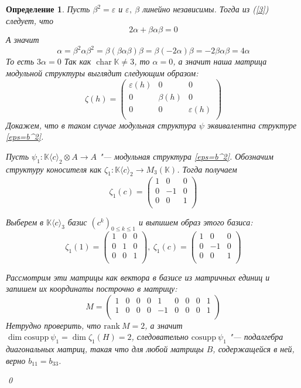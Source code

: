 \documentclass[12pt, reqno, a4paper, oneside, notitlepage]{amsart}
\makeatletter
\theoremstyle{mytheoremstyle}
\theoremstyle{myremarkstyle}
\newtheorem{definition}[theorem]{Определение}
\numberwithin{equation}{section}
\renewenvironment{proof}[1][\proofname]{\par\indent {\bfseries #1\@addpunct{.} }}{\qed}
\DeclareMathOperator{\chr}{char}
\makeatother
\begin{document}
\begin{definition}
\begin{proof}
	Пусть $\beta^2 = \varepsilon$ и $\varepsilon,\ \beta$ линейно независимы.
	Тогда из (\ref{3}) следует, что
	\[
	  2\alpha +\beta\alpha\beta = 0
	\]
	А значит \[
	  \alpha = \beta^2\alpha\beta^2 = \beta(\beta\alpha\beta)\beta = \beta (-2\alpha)\beta = -2\beta\alpha\beta = 4\alpha
	\]
	То есть $3\alpha = 0$
	Так как $\chr \mathbb{K} \neq 3$, то $\alpha = 0$, а значит наша матрица модульной структуры выглядит следующим образом:\[
    \zeta(h) = \begin{pmatrix}
        \varepsilon(h) & 0 & 0\\
        0 & \beta(h) & 0\\
        0 & 0 & \varepsilon(h)\\
    \end{pmatrix}
    \]
	Докажем, что в таком случае модульная структура $\psi$ эквивалентна структуре \ref{eps=b^2}.

    Пусть $\psi_1: \mathbb{K}\langle c\rangle_2 \otimes A \to A$ "--- модульная структура \ref{eps=b^2}.
	Обозначим структуру коносителя как $\zeta_1:\mathbb{K}\langle c\rangle_2 \to M_3(\mathbb{K})$. Тогда получаем \[
    \zeta_1(c) = \begin{pmatrix}
        1 & 0 & 0\\
        0 & -1 & 0\\
        0 & 0 & 1\\
    \end{pmatrix}
    \]

    Выберем в $\mathbb{K}\langle c\rangle_3$  базис $(c^k)_{0 \leq k \leq 1}$ и выпишем образ этого базиса:
    \[
    \zeta_1(1) = \begin{pmatrix}
        1 & 0 & 0\\
        0 & 1 & 0\\
        0 & 0 & 1\\
    \end{pmatrix},\
    \zeta_1(c) = \begin{pmatrix}
        1 & 0 & 0\\
        0 & -1 & 0\\
        0 & 0 & 1\\
    \end{pmatrix}
    \]

    Рассмотрим эти матрицы как вектора в базисе из матричных единиц и запишем их координаты построчно в матрицу: \[
        M = \begin{pmatrix}
            1 & 0 & 0 & 0 & 1 & 0 & 0 & 0 & 1\\
            1 & 0 & 0 & 0 & -1 & 0 & 0 & 0 & 1\\
        \end{pmatrix}
    \]
    Нетрудно проверить, что $\mathrm{rank}\ M = 2$, а значит $\dim \mathrm{cosupp}\ \psi_1 = \dim \zeta_1(H) = 2$, следовательно $\mathrm{cosupp}\ \psi_1$ "--- подалгебра диагональных матриц, такая что для любой матрицы $B$, содержащейся в ней, верно $b_{11}=b_{33}$.


\end{proof}
\end{definition}
\end{document}
